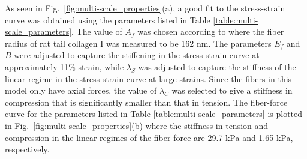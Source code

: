 \documentclass[]{interact}
\begin{document}
As seen in Fig.\ \ref{fig:multi-scale_properties}(a), a good fit to the stress-strain curve was obtained using the parameters listed in Table \ref{table:multi-scale_parameters}. The value of $A_f$ was chosen according to \citep{Dutov:2016gu} where the fiber radius of rat tail collagen I was measured to be 162 nm. The parameters $E_f$ and $B$ were adjusted to capture the stiffening in the stress-strain curve at approximately 11$\%$ strain, while $\lambda_S$ was adjusted to capture the stiffness of the linear regime in the stress-strain curve at large strains. Since the fibers in this model only have axial forces, the value of $\lambda_C$ was selected to give a stiffness in compression that is significantly smaller than that in tension. The fiber-force curve for the parameters listed in Table \ref{table:multi-scale_parameters} is plotted in Fig.\ \ref{fig:multi-scale_properties}(b) where the stiffness in tension and compression in the linear regimes of the fiber force are 29.7 kPa and 1.65 kPa, respectively.
%
\end{document}
